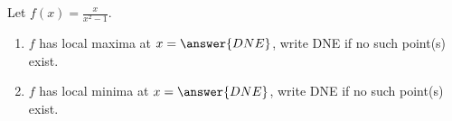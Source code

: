 \documentclass{ximera}
\author{Gregory Hartman \and Matthew Carr}
\begin{document}
\begin{exercise}






Let $f(x)=\frac{x}{x^2-1}$.
\begin{enumerate}
\item		$f$ has local maxima at $x=\answer{DNE}$, write DNE if no such point(s) exist.
\item		$f$ has local minima at $x=\answer{DNE}$, write DNE if no such point(s) exist.
\end{enumerate}

\end{exercise}
\end{document}
